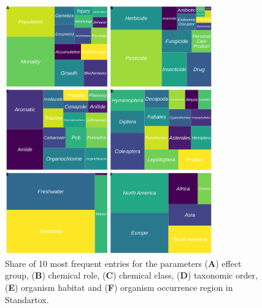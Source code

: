 \documentclass[journal,datadescriptor,accept,moreauthors,pdftex]{Definitions/mdpi}
\begin{document}
\begin{figure}[H]
    \centering
    \includegraphics[width=0.8\textwidth]{article/figures/standartox_parameters.png}
    \caption{Share of 10 most frequent entries for the parameters (\textbf{A}) effect group, (\textbf{B}) chemical role, (\textbf{C}) chemical class, (\textbf{D}) taxonomic order, (\textbf{E}) organism habitat and (\textbf{F}) organism occurrence region in Standartox.}
    \label{fig:stx-parameters}
\end{figure}
\end{document}
